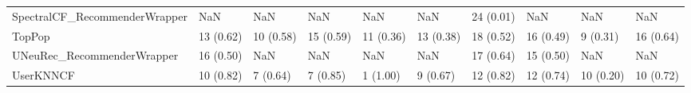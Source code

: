 \begin{tabular}{llllllllll}
      SpectralCF\_RecommenderWrapper &                      NaN &         NaN &           NaN &          NaN &                  NaN &           24 (0.01) &               NaN &                NaN &               NaN \\
                             TopPop &                13 (0.62) &   10 (0.58) &     15 (0.59) &    11 (0.36) &            13 (0.38) &           18 (0.52) &         16 (0.49) &           9 (0.31) &         16 (0.64) \\
         UNeuRec\_RecommenderWrapper &                16 (0.50) &         NaN &           NaN &          NaN &                  NaN &           17 (0.64) &         15 (0.50) &                NaN &               NaN \\
                          UserKNNCF &                10 (0.82) &    7 (0.64) &      7 (0.85) &     1 (1.00) &             9 (0.67) &           12 (0.82) &         12 (0.74) &          10 (0.20) &         10 (0.72) \\
\bottomrule
\end{tabular}
